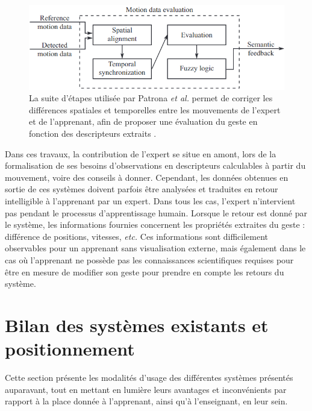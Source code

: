\begin{figure}
    \centering
    \includegraphics[width=\textwidth]{pictures/Patrona_motion_evaluation.png}
    \caption[Étapes de normalisation et d'analyse automatique du mouvement \parencite{Patrona2018MaA}]{La suite d'étapes utilisée par Patrona \textit{et al.} permet de corriger les différences spatiales et temporelles entre les mouvements de l'expert et de l'apprenant, afin de proposer une évaluation du geste en fonction des descripteurs extraits \parencite{Patrona2018MaA}.}
    \label{fig:Patrona_motion_evaluation}
\end{figure}

Dans ces travaux, la contribution de l'expert se situe en amont, lors de la formalisation de ses besoins d'observations en descripteurs calculables à partir du mouvement, voire des conseils à donner. Cependant, les données obtenues en sortie de ces systèmes doivent parfois être analysées et traduites en retour intelligible à l'apprenant par un expert. Dans tous les cas, l'expert n'intervient pas pendant le processus d'apprentissage humain. Lorsque le retour est donné par le système, les informations fournies concernent les propriétés extraites du geste : différence de positions, vitesses, \textit{etc.} Ces informations sont difficilement observables pour un apprenant sans visualisation externe, mais également dans le cas où l'apprenant ne possède pas les connaissances scientifiques requises pour être en mesure de modifier son geste pour prendre en compte les retours du système.

\section{Bilan des systèmes existants et positionnement}
Cette section présente les modalités d'usage des différentes systèmes présentés auparavant, tout en mettant en lumière leurs avantages et inconvénients par rapport à la place donnée à l'apprenant, ainsi qu'à l'enseignant, en leur sein.


